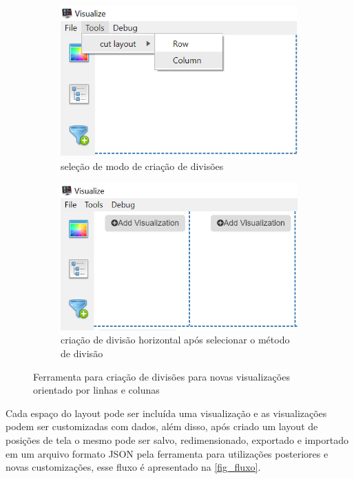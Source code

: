 \documentclass[
	12pt,				%
	openright,			%
	oneside,			%
	a4paper,			%
	english,			%
	brazil				%
	]{abntex2}
\begin{document}
\begin{figure}[ht]
\begin{subfigure}{.5\textwidth}
  \centering
  \includegraphics[width=.8\linewidth]{figures/divisor1.png}  
  \caption{seleção de modo de criação de divisões}
  \label{fig:sub-first}
\end{subfigure}
\begin{subfigure}{.5\textwidth}
  \centering
  \includegraphics[width=.8\linewidth]{figures/divisor2.png}  
  \caption{criação de divisão horizontal após selecionar o método de divisão}
  \label{fig:sub-second}
\end{subfigure}
\caption{Ferramenta para criação de divisões para novas visualizações orientado por linhas e colunas}
\label{fig_layout}
\end{figure}



Cada espaço do layout pode ser incluída uma visualização e as visualizações podem ser customizadas com dados, além disso, após criado um layout de posições de tela o mesmo pode ser salvo, redimensionado, exportado e importado em um arquivo formato JSON pela ferramenta para utilizações posteriores e novas customizações, esse fluxo é apresentado na \autoref{fig_fluxo}.
\end{document}

